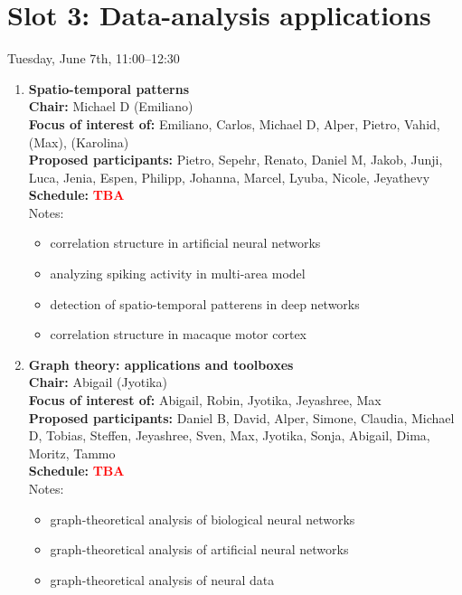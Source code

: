\documentclass[10pt, a4paper,twoside,american]{article}
\newcommand{\alert}[1]{\textcolor{red}{\bf #1}}
\begin{document}
\section*{Slot 3: Data-analysis applications}
Tuesday, June 7th, 11:00--12:30

\begin{enumerate}[resume]
\item {\large\bf Spatio-temporal patterns}\\[1ex]
  {\bf Chair:} Michael D (Emiliano)\\[1ex]
  {\bf Focus of interest of:} Emiliano, Carlos, Michael D, Alper, Pietro, Vahid, (Max), (Karolina)\\[1ex]
  {\bf Proposed participants:} Pietro, Sepehr, Renato, Daniel M, Jakob, Junji, Luca, Jenia, Espen, Philipp, Johanna, Marcel, Lyuba, Nicole, Jeyathevy\\[1ex]
  {\bf Schedule:} \alert{TBA}\\[1ex]
  Notes:
  \begin{itemize}
  \item correlation structure in artificial neural networks
  \item analyzing spiking activity in multi-area model
  \item detection of spatio-temporal patterens in deep networks
  \item correlation structure in macaque motor cortex
  \end{itemize}
\item {\large\bf Graph theory: applications and toolboxes}\\[1ex]
  {\bf Chair:} Abigail (Jyotika)\\[1ex]
  {\bf Focus of interest of:} Abigail, Robin, Jyotika, Jeyashree, Max\\[1ex]
  {\bf Proposed participants:} Daniel B, David, Alper, Simone, Claudia, Michael D, Tobias, Steffen, Jeyashree, Sven, Max, Jyotika, Sonja, Abigail, Dima, Moritz, Tammo\\[1ex]
  {\bf Schedule:} \alert{TBA}\\[1ex]
  Notes:
  \begin{itemize}
  \item graph-theoretical analysis of biological neural networks 
  \item graph-theoretical analysis of artificial neural networks
  \item graph-theoretical analysis of neural data

\end{itemize}
\end{enumerate}
\end{document}
